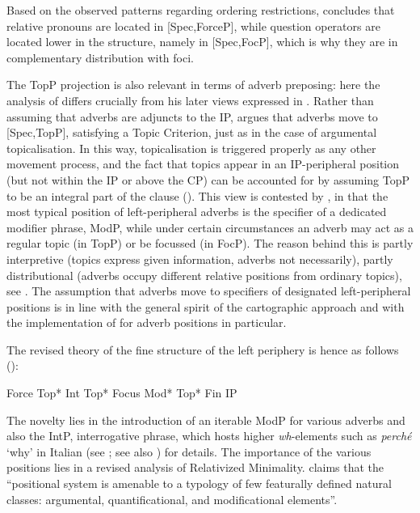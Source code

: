 Based on the observed patterns regarding ordering restrictions, \citet[291, 298--299]{rizzi1997} concludes that relative pronouns are located in [Spec,ForceP], while question operators are located lower in the structure, namely in [Spec,FocP], which is why they are in complementary distribution with foci.

The TopP projection is also relevant in terms of adverb preposing: here the analysis of \citet{rizzi1997} differs crucially from his later views expressed in \citet{rizzi2004}. Rather than assuming that adverbs are adjuncts to the IP, \citet[300--301, 308--309]{rizzi1997} argues that adverbs move to [Spec,TopP], satisfying a Topic Criterion, just as in the case of argumental topicalisation. In this way, topicalisation is triggered properly as any other movement process, and the fact that topics appear in an IP-peripheral position (but not within the IP or above the CP) can be accounted for by assuming TopP to be an integral part of the clause (\citealt[300--301]{rizzi1997}). This view is contested by \citet[238--243]{rizzi2004}, in that the most typical position of left-peripheral adverbs is the specifier of a dedicated modifier phrase, ModP, while under certain circumstances an adverb may act as a regular topic (in TopP) or be focussed (in FocP). The reason behind this is partly interpretive (topics express given information, adverbs not necessarily), partly distributional (adverbs occupy different relative positions from ordinary topics), see \citet[238--239]{rizzi2004}. The assumption that adverbs move to specifiers of designated left-peripheral positions is in line with the general spirit of the cartographic approach and with the implementation of \citet{cinque1999} for adverb positions in particular.

The revised theory of the fine structure of the left periphery is hence as follows (\citealt[242, ex. 60]{rizzi2004}):

\ea Force \phantom{\ldots}Top* \phantom{\ldots}Int \phantom{\ldots}Top* \phantom{\ldots}Focus \phantom{\ldots}Mod* \phantom{\ldots}Top* \phantom{\ldots}Fin \phantom{\ldots}IP
\z

The novelty lies in the introduction of an iterable ModP for various adverbs and also the IntP, interrogative phrase, which hosts higher \textit{wh}-elements such as \textit{perch\'e} `why' in Italian (see \citealt[242]{rizzi2004}; see also \citealt{rizzi2001}) for details. The importance of the various positions lies in a revised analysis of Relativized Minimality. \citet[247]{rizzi2004} claims that the ``positional system is amenable to a typology of few featurally defined natural classes: argumental, quantificational, and modificational elements''.

